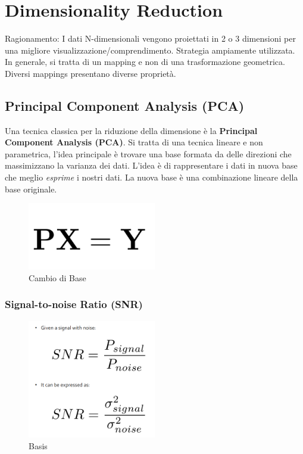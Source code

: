 \section{Dimensionality Reduction}
Ragionamento: I dati N-dimensionali vengono proiettati in 2 o 3 dimensioni per una migliore visualizzazione/comprendimento.
Strategia ampiamente utilizzata.
In generale, si tratta di un mapping e non di una trasformazione geometrica.
Diversi mappings presentano diverse proprietà.
\subsection{Principal Component Analysis (PCA)}
Una tecnica classica per la riduzione della dimensione è la \textbf{Principal Component Analysis (PCA)}.
Si tratta di una tecnica lineare e non parametrica, l'idea principale è trovare una base formata da delle direzioni che massimizzano la varianza dei dati.
L'idea è di rappresentare i dati in nuova base che meglio \textit{esprime} i nostri dati.
La nuova base è una combinazione lineare della base originale.
\begin{figure}[H]
    \centering
    \includegraphics[width=0.5\textwidth]{images/Basis.png} 
    \caption{Cambio di Base}
    \label{fig:immagine}
\end{figure}
\subsubsection{Signal-to-noise Ratio (SNR)}
\begin{figure}[H]
    \centering
    \includegraphics[width=0.5\textwidth]{images/Radio.png} 
    \caption{Basis}
    \label{fig:immagine}
\end{figure}
